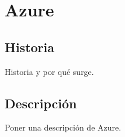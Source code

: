\chapter{Azure}
\section{Historia}
Historia y por qué surge.

\section{Descripción}
Poner una descripción de Azure.
